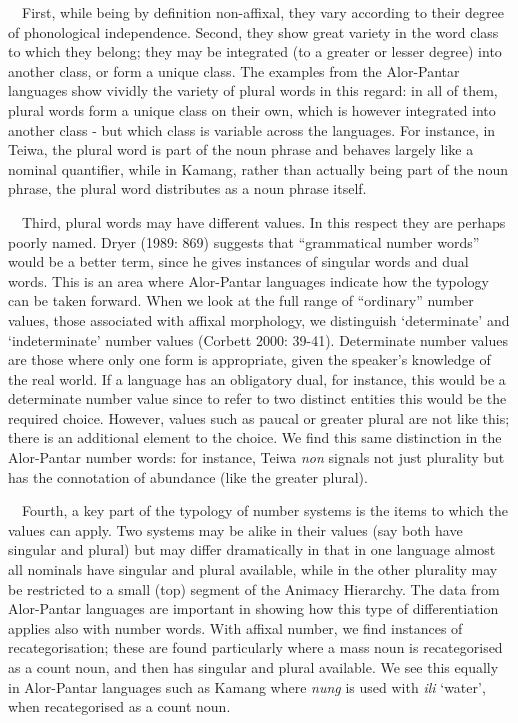 \ \ First, while being by definition non-affixal, they vary according to their degree of phonological independence. Second, they show great variety in the word class to which they belong; they may be integrated (to a greater or lesser degree) into another class, or form a unique class. The examples from the Alor-Pantar languages show vividly the variety of plural words in this regard: in all of them, plural words form a unique class on their own, which is however integrated into another class - but which class is variable across the languages. For instance, in Teiwa, the plural word is part of the noun phrase and behaves largely like a nominal quantifier, while in Kamang, rather than actually being part of the noun phrase, the plural word distributes as a noun phrase itself. 

\ \ Third, plural words may have different values. In this respect they are perhaps poorly named. Dryer (1989: 869) suggests that {\textquotedblleft}grammatical number words{\textquotedblright} would be a better term, since he gives instances of singular words and dual words. This is an area where Alor-Pantar languages indicate how the typology can be taken forward. When we look at the full range of {\textquotedblleft}ordinary{\textquotedblright} number values, those associated with affixal morphology, we distinguish {\textquoteleft}determinate{\textquoteright} and {\textquoteleft}indeterminate{\textquoteright} number values (Corbett 2000: 39-41). Determinate number values are those where only one form is appropriate, given the speaker{\textquoteright}s knowledge of the real world. If a language has an obligatory dual, for instance, this would be a determinate number value since to refer to two distinct entities this would be the required choice. However, values such as paucal or greater plural are not like 
this; there is an additional element to the choice. We find this same distinction in the Alor-Pantar number words: for instance, Teiwa \textit{non }signals not just plurality but has the connotation of abundance (like the greater plural).

\ \ Fourth, a key part of the typology of number systems is the items to which the values can apply. Two systems may be alike in their values (say both have singular and plural) but may differ dramatically in that in one language almost all nominals have singular and plural available, while in the other plurality may be restricted to a small (top) segment of the Animacy Hierarchy. The data from Alor-Pantar languages are important in showing how this type of differentiation applies also with number words. With affixal number, we find instances of recategorisation; these are found particularly where a mass noun is recategorised as a count noun, and then has singular and plural available. We see this equally in Alor-Pantar languages such as Kamang where \textit{nung }is used with \textit{ili }{\textquoteleft}water{\textquoteright}, when recategorised as a count noun. 

